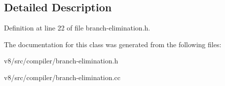\subsection{Detailed Description}


Definition at line 22 of file branch-\/elimination.\+h.



The documentation for this class was generated from the following files\+:\begin{DoxyCompactItemize}
\item 
v8/src/compiler/branch-\/elimination.\+h\item 
v8/src/compiler/branch-\/elimination.\+cc\end{DoxyCompactItemize}
